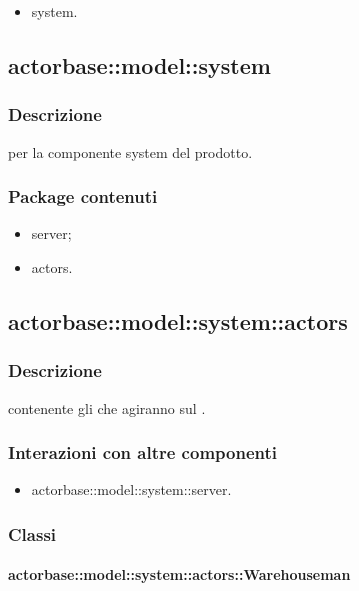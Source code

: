 \documentclass{scalatekids-article}
\begin{document}
\begin{itemize}
\item system.
\end{itemize}

\subsection{actorbase::model::system}

\subsubsection{Descrizione}

 per la componente system del prodotto.

\subsubsection{Package contenuti}

\begin{itemize}
\item server;
\item actors.
\end{itemize}

\subsection{actorbase::model::system::actors}

\subsubsection{Descrizione}

 contenente gli  che agiranno sul .

\subsubsection{Interazioni con altre componenti}

\begin{itemize}
\item actorbase::model::system::server.
\end{itemize}

\subsubsection{Classi}

\paragraph{actorbase::model::system::actors::Warehouseman}
\end{document}
